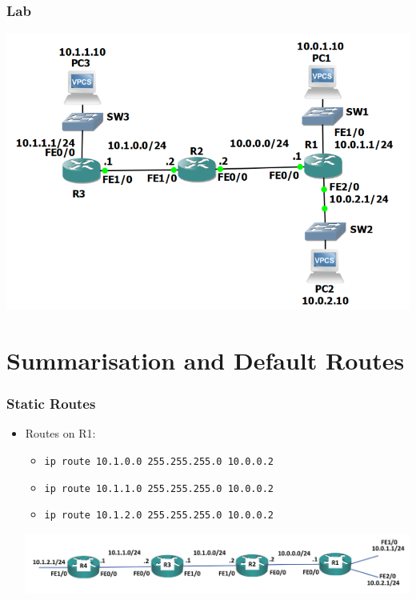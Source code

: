 \documentclass[pdflatex,compress,mathserif]{beamer}
\begin{document}
\begin{frame}
	\frametitle{Lab}
	\begin{center}
		\includegraphics[width=0.8\linewidth]{img/img05}
	\end{center}
\end{frame}

\section{Summarisation and Default Routes}

\begin{frame}
	\frametitle{Static Routes}
	\begin{itemize}
		\item Routes on R1:
		\begin{itemize}
			\item[] \texttt{ip route 10.1.0.0 255.255.255.0 10.0.0.2}
			\item[] \texttt{ip route 10.1.1.0 255.255.255.0 10.0.0.2}
			\item[] \texttt{ip route 10.1.2.0 255.255.255.0 10.0.0.2}
		\end{itemize}
		\begin{center}
			\includegraphics[width=\linewidth]{img/img06}
		\end{center}
	\end{itemize}
\end{frame}
\end{document}
